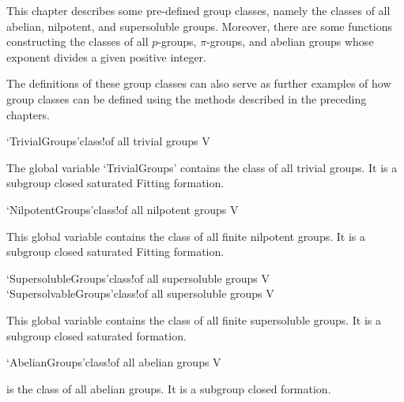 
This chapter describes some pre-defined 
group classes, namely the classes of all abelian, nilpotent, and supersoluble
groups. Moreover, there are some functions constructing the classes of all
$p$-groups, $\pi$-groups, and abelian groups whose exponent divides a given
positive integer. 

The definitions of these group classes can also serve as further examples of
how group classes can be defined using the methods described in the preceding
chapters.

\null

\>`TrivialGroups'{class}!{of all trivial groups} V

\relax
{}\relax
{}\relax
The global variable `TrivialGroups' contains the class of all trivial groups. It is a
subgroup closed saturated Fitting formation.

\>`NilpotentGroups'{class}!{of all nilpotent groups} V

\relax
{}\relax
{}\relax
This global variable contains the class of all finite nilpotent groups. It is a
subgroup closed saturated Fitting formation.


\>`SupersolubleGroups'{class}!{of all supersoluble groups} V
\>`SupersolvableGroups'{class}!{of all supersoluble groups} V

\relax
{}\relax
{}\relax
{}\relax
This global variable contains the class of all finite supersoluble groups. It
is a subgroup closed saturated formation.


\>`AbelianGroups'{class}!{of all abelian groups} V

\relax
{}\relax
{}\relax
is the class of all abelian groups. It is a subgroup closed formation.


